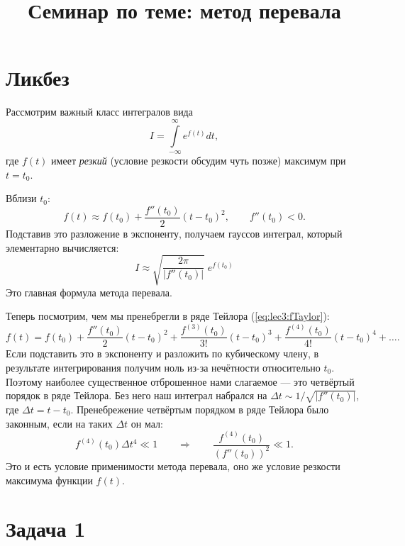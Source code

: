 \documentclass[a4paper,12pt]{article}
\begin{document}
\title{Семинар по теме: метод перевала}
\maketitle

\section*{Ликбез}
Рассмотрим важный класс интегралов вида
\begin{equation} \label{eq:lec3:I}
I = \int\limits_{-\infty}^\infty e^{f(t)} dt,
\end{equation}
где $f(t)$ имеет \emph{резкий} (условие резкости обсудим чуть позже) максимум при $t=t_0$.

\noindent
Вблизи $t_0$:
\begin{equation} 
\label{eq:lec3:fTaylor}
f(t) \approx f(t_0) + \frac{f''(t_0)}2 (t-t_0)^2,\qquad f''(t_0) <0.
\end{equation}
Подставив это разложение в экспоненту, получаем гауссов интеграл, который элементарно вычисляется:
\begin{equation} \label{eq:lec3:Isaddle}
\boxed{I \approx
	\sqrt{ \frac{2\pi}{|f''(t_0)|} } \; e^{f(t_0)} }
\end{equation}
Это главная формула метода перевала.

Теперь посмотрим, чем мы пренебрегли в ряде Тейлора (\ref{eq:lec3:fTaylor}):
\[
f(t) = f(t_0) + \frac{f''(t_0)}2 (t-t_0)^2 + \frac{f^{(3)}(t_0)}{3!} (t-t_0)^3  + \frac{f^{(4)}(t_0)}{4!} (t-t_0)^4 + \dots  .
\]
Если подставить это в экспоненту и разложить по кубическому члену, в результате интегрирования получим ноль из-за нечётности относительно $t_0$. Поэтому наиболее существенное отброшенное нами слагаемое --- это четвёртый порядок в ряде Тейлора. Без него наш интеграл набрался на $\Delta t \sim 1/\sqrt{|f''(t_0)|}$, где $\Delta t = t-t_0$. Пренебрежение четвёртым порядком в ряде Тейлора было законным, если на таких $\Delta t$ он мал:
\begin{equation} \label{eq:lec3:condition}
f^{(4)} (t_0) \Delta t^4 \ll 1
\qquad\Longrightarrow\qquad
\frac{f^{(4)}(t_0)}{\left( f''(t_0) \right)^2} \ll 1.
\end{equation}
Это и есть условие применимости метода перевала, оно же условие резкости максимума функции $f(t)$.

\section*{Задача 1}
\end{document}
